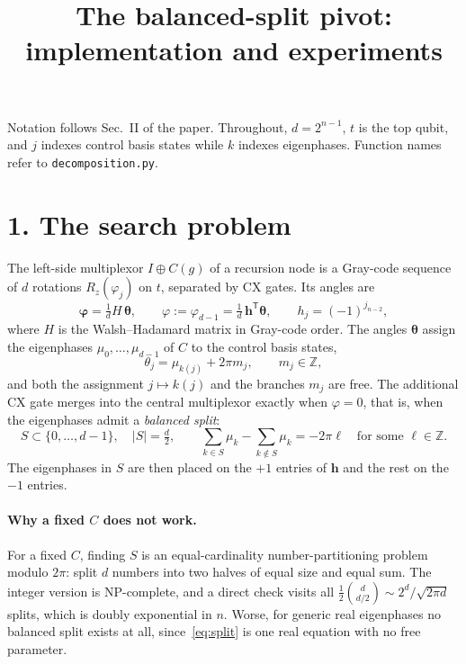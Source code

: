 \documentclass[11pt]{article}
\title{The balanced-split pivot: implementation and experiments}
\date{}
\begin{document}
\maketitle

Notation follows Sec.~II of the paper. Throughout, $d=2^{n-1}$, $t$ is the top qubit, and $j$
indexes control basis states while $k$ indexes eigenphases. Function names refer to
\texttt{decomposition.py}.

\section*{1. The search problem}

The left-side multiplexor $I\oplus C(g)$ of a recursion node is a Gray-code sequence of $d$
rotations $R_z(\varphi_j)$ on $t$, separated by CX gates. Its angles are
\begin{equation}\label{eq:phi}
\boldsymbol\varphi=\tfrac1d H\,\boldsymbol\theta,\qquad
\varphi:=\varphi_{d-1}=\tfrac1d\,\mathbf h^{\mathsf T}\boldsymbol\theta,\qquad h_j=(-1)^{j_{n-2}},
\end{equation}
where $H$ is the Walsh--Hadamard matrix in Gray-code order. The angles $\boldsymbol\theta$ assign
the eigenphases $\mu_0,\dots,\mu_{d-1}$ of $C$ to the control basis states,
\begin{equation}\label{eq:branch}
\theta_j=\mu_{k(j)}+2\pi m_j,\qquad m_j\in\mathbb Z,
\end{equation}
and both the assignment $j\mapsto k(j)$ and the branches $m_j$ are free. The additional CX gate
merges into the central multiplexor exactly when $\varphi=0$, that is, when the eigenphases admit
a \emph{balanced split}:
\begin{equation}\label{eq:split}
S\subset\{0,\dots,d-1\},\quad |S|=\tfrac d2,\qquad
\sum_{k\in S}\mu_k-\sum_{k\notin S}\mu_k=-2\pi\ell\quad\text{for some }\ell\in\mathbb Z .
\end{equation}
The eigenphases in $S$ are then placed on the $+1$ entries of $\mathbf h$ and the rest on the $-1$
entries.

\paragraph{Why a fixed $C$ does not work.} For a fixed $C$, finding $S$ is an equal-cardinality
number-partitioning problem modulo $2\pi$: split $d$ numbers into two halves of equal size and
equal sum. The integer version is NP-complete, and a direct check visits all
$\tfrac12\binom{d}{d/2}\sim 2^d/\sqrt{2\pi d}$ splits, which is doubly exponential in $n$. Worse,
for generic real eigenphases no balanced split exists at all, since~\eqref{eq:split} is one real
equation with no free parameter.
\end{document}
